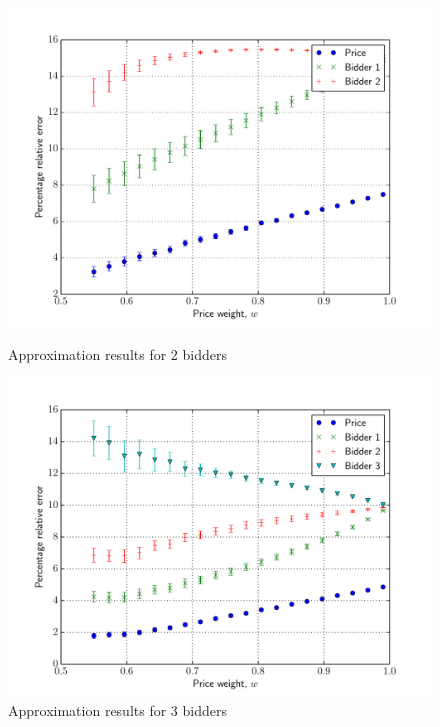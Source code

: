 \begin{figure}[p!]
  \includegraphics[width=\figsize]{Approximation/Figures/compare_2_bidders}
  \caption{Approximation results for 2 bidders}
  \label{fig:compare_2_bidders_approximation}
  \vspace{10mm}
  \includegraphics[width=\figsize]{Approximation/Figures/compare_3_bidders}
  \caption{Approximation results for 3 bidders}
  \label{fig:compare_3_bidders_approximation}
\end{figure}

